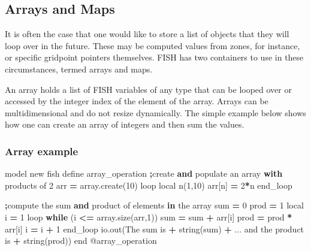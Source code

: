\documentclass[a4paper, nobind]{templates/ociamthesis}
\newenvironment{Shaded}{\begin{snugshade}}{\end{snugshade}}
\newcommand{\AttributeTok}[1]{\textcolor[rgb]{0.77,0.63,0.00}{#1}}
\newcommand{\BuiltInTok}[1]{#1}
\newcommand{\ControlFlowTok}[1]{\textcolor[rgb]{0.13,0.29,0.53}{\textbf{#1}}}
\newcommand{\DecValTok}[1]{\textcolor[rgb]{0.00,0.00,0.81}{#1}}
\newcommand{\KeywordTok}[1]{\textcolor[rgb]{0.13,0.29,0.53}{\textbf{#1}}}
\newcommand{\NormalTok}[1]{#1}
\newcommand{\OperatorTok}[1]{\textcolor[rgb]{0.81,0.36,0.00}{\textbf{#1}}}
\newcommand{\StringTok}[1]{\textcolor[rgb]{0.31,0.60,0.02}{#1}}
\renewenvironment{Shaded}
{
  \vspace{10pt}%
  \begin{snugshade}%
}{%
  \end{snugshade}%
  \vspace{8pt}%
}
\begin{document}
\hypertarget{arrays-and-maps}{%
\subsection{Arrays and Maps}\label{arrays-and-maps}}

It is often the case that one would like to store a list of objects that
they will loop over in the future. These may be computed values from
zones, for instance, or specific gridpoint pointers themselves. FISH has
two containers to use in these circumstances, termed arrays and maps.

An array holds a list of FISH variables of any type that can be looped
over or accessed by the integer index of the element of the array.
Arrays can be multidimensional and do not resize dynamically. The simple
example below shows how one can create an array of integers and then sum
the values.

\hypertarget{array-example}{%
\subsubsection{Array example}\label{array-example}}

\begin{Shaded}
\begin{Highlighting}[]
\NormalTok{model new}
\NormalTok{fish define array\_operation}
    \OperatorTok{;}\NormalTok{create }\KeywordTok{and}\NormalTok{ populate an array }\ControlFlowTok{with}\NormalTok{ products of }\DecValTok{2}
\NormalTok{    arr }\OperatorTok{=}\NormalTok{ array.create(}\DecValTok{10}\NormalTok{)}
\NormalTok{    loop local n(}\DecValTok{1}\NormalTok{,}\DecValTok{10}\NormalTok{)}
\NormalTok{        arr[n] }\OperatorTok{=} \DecValTok{2}\OperatorTok{*}\NormalTok{n}
\NormalTok{    end\_loop}
      
    \OperatorTok{;}\NormalTok{compute the }\BuiltInTok{sum} \KeywordTok{and}\NormalTok{ product of elements }\KeywordTok{in}\NormalTok{ the array}
    \BuiltInTok{sum} \OperatorTok{=} \DecValTok{0}
\NormalTok{    prod }\OperatorTok{=} \DecValTok{1}
\NormalTok{    local i }\OperatorTok{=} \DecValTok{1}
\NormalTok{    loop }\ControlFlowTok{while}\NormalTok{ (i }\OperatorTok{\textless{}=}\NormalTok{ array.size(arr,}\DecValTok{1}\NormalTok{))}
        \BuiltInTok{sum} \OperatorTok{=} \BuiltInTok{sum} \OperatorTok{+}\NormalTok{ arr[i]}
\NormalTok{        prod }\OperatorTok{=}\NormalTok{ prod }\OperatorTok{*}\NormalTok{ arr[i]}
\NormalTok{        i }\OperatorTok{=}\NormalTok{ i }\OperatorTok{+} \DecValTok{1}
\NormalTok{    end\_loop}
\NormalTok{    io.out(}\StringTok{\textquotesingle{}The sum is \textquotesingle{}} \OperatorTok{+}\NormalTok{ string(}\BuiltInTok{sum}\NormalTok{) }\OperatorTok{+}\NormalTok{ ...}
           \StringTok{\textquotesingle{} and the product is \textquotesingle{}} \OperatorTok{+}\NormalTok{ string(prod))}
\NormalTok{end}
\AttributeTok{@array\_operation}
\end{Highlighting}
\end{Shaded}
\end{document}
